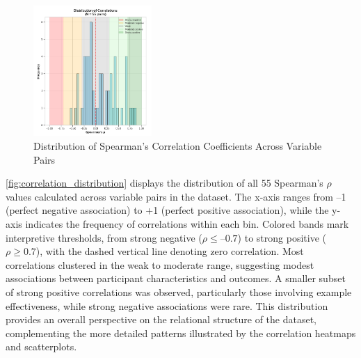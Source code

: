 \begin{figure}[h]
\centering
\includegraphics[width=0.4\textwidth]{figures/12.png}
\caption{Distribution of Spearman's Correlation Coefficients Across Variable Pairs}
\label{fig:correlation_distribution}
\end{figure}

\autoref{fig:correlation_distribution} displays the distribution of all 55 Spearman's $\rho$ values calculated across variable pairs in the dataset. The x-axis ranges from –1 (perfect negative association) to +1 (perfect positive association), while the y-axis indicates the frequency of correlations within each bin. Colored bands mark interpretive thresholds, from strong negative ($\rho \leq –0.7$) to strong positive ($\rho \geq 0.7$), with the dashed vertical line denoting zero correlation. Most correlations clustered in the weak to moderate range, suggesting modest associations between participant characteristics and outcomes. A smaller subset of strong positive correlations was observed, particularly those involving example effectiveness, while strong negative associations were rare. This distribution provides an overall perspective on the relational structure of the dataset, complementing the more detailed patterns illustrated by the correlation heatmaps and scatterplots.


